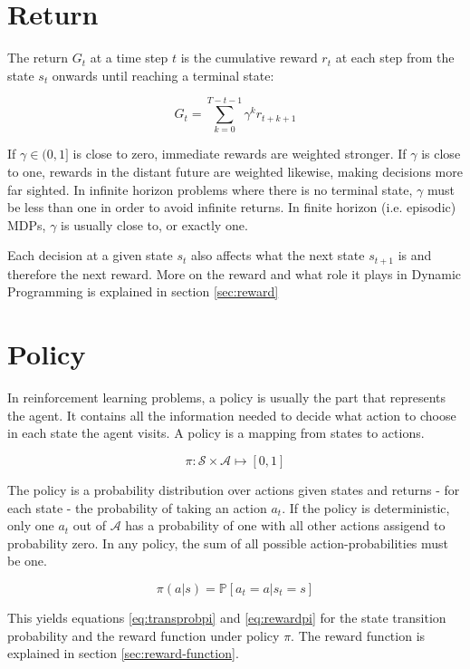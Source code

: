 \section{Return}

The return $G_t$ at a time step $t$ is the cumulative reward $r_t$ at each step from the state $s_t$ onwards until reaching a terminal state:

\begin{equation}
G_t = \sum_{k=0}^{T-t-1}\gamma^k r_{t+k+1}
\end{equation}

If $\gamma \in (0,1]$ is close to zero, immediate rewards are weighted stronger. If $\gamma$ is close to one, rewards in the distant future are weighted likewise, making decisions more far sighted. In infinite horizon problems where there is no terminal state, $\gamma$ must be less than one in order to avoid infinite returns. In finite horizon (i.e. episodic) MDPs, $\gamma$ is usually close to, or exactly one.

Each decision at a given state $s_t$ also affects what the next state $s_{t+1}$ is and therefore the next reward. More on the reward and what role it plays in Dynamic Programming is explained in section \ref{sec:reward}

\section{Policy}
\label{sec:policy}
In reinforcement learning problems, a policy is usually the part that represents the agent. It contains all the information needed to decide what action to choose in each state the agent visits. A policy is a mapping from states to actions.

\begin{equation}
\pi: \mathcal{S} \times \mathcal{A} \mapsto [0,1]
\end{equation} 

The policy is a probability distribution over actions given states and returns - for each state - the probability of taking an action $a_t$. If the policy is deterministic, only one $a_t$ out of $\mathcal{A}$ has a probability of one with all other actions assigend to probability zero. In any policy, the sum of all possible action-probabilities must be one.

\begin{equation}
\pi(a|s) = \mathbb{P}[a_t=a|s_t=s]
\end{equation}

This yields equations \ref{eq:transprobpi} and \ref{eq:rewardpi} for the state transition probability and the reward function under policy $\pi$. The reward function is explained in section \ref{sec:reward-function}.

